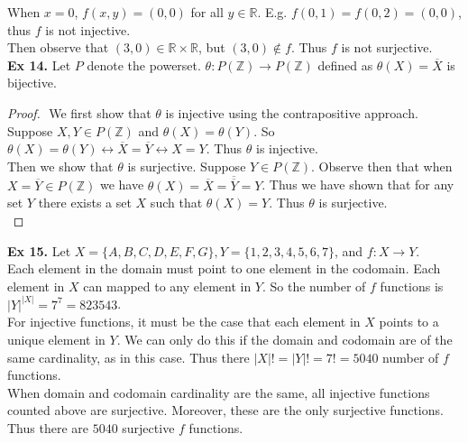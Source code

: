 \documentclass{article}
\begin{document}
\noindent When $x=0$, $f(x, y)=(0,0)$ for all $y \in \mathbb{R}$. E.g. $f(0,1)=f(0,2)=(0,0)$, thus $f$ is not injective.\\ 

\noindent Then observe that $(3, 0) \in \mathbb{R} \times \mathbb{R}$, but $(3, 0) \not\in f$. Thus $f$ is not surjective.\\

\noindent \textbf{Ex 14.} Let $P$ denote the powerset. $\theta: P(\mathbb{Z}) \rightarrow P(\mathbb{Z})$ defined as $\theta(X)=\overline{X}$ is bijective.

\begin{proof}
$ $\newline
We first show that $\theta$ is injective using the contrapositive approach. Suppose $X,Y \in P(\mathbb{Z})$ and $\theta(X) = \theta(Y)$. So $\theta(X) = \theta(Y) \leftrightarrow \overline{X} = \overline{Y} \leftrightarrow X = Y$. Thus $\theta$ is injective.\\

\noindent Then we show that $\theta$ is surjective. Suppose $Y \in P(\mathbb{Z})$. Observe then that when $X = \overline{Y} \in P(\mathbb{Z})$ we have $\theta(X)=\overline{X} = \overline{\overline{Y}} = Y$. Thus we have shown that for any set $Y$ there exists a set $X$ such that $\theta(X)=Y$. Thus $\theta$ is surjective.\\
\end{proof}

\newpage

\noindent \textbf{Ex 15.} Let $X = \{A,B,C,D,E,F,G\}, Y=\{1,2,3,4,5,6,7\}$, and $f: X \rightarrow Y$.\\

\noindent Each element in the domain must point to one element in the codomain. Each element in $X$ can mapped to any element in $Y$. So the number of $f$ functions is $|Y|^{|X|}=7^7=823543$.\\

\noindent For injective functions, it must be the case that each element in $X$ points to a unique element in $Y$. We can only do this if the domain and codomain are of the same cardinality, as in this case. Thus there $|X|!=|Y|!=7!=5040$ number of $f$ functions.\\

\noindent When domain and codomain cardinality are the same, all injective functions counted above are surjective. Moreover, these are the only surjective functions. Thus there are $5040$ surjective $f$ functions.\\
\end{document}
